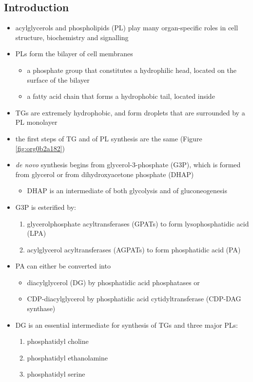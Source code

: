 \documentclass[12pt]{scrartcl}
\begin{document}
\subsection{Introduction}
\label{sec:org95c6505}
\begin{itemize}
\item acylglycerols and phospholipids (PL) play many organ-specific roles
in cell structure, biochemistry and signalling
\item PLs form the bilayer of cell membranes
\begin{itemize}
\item a phosphate group that constitutes a hydrophilic head, located on the surface of the bilayer
\item a fatty acid chain that forms a hydrophobic tail, located inside
\end{itemize}
\item TGs are extremely hydrophobic, and form droplets
that are surrounded by a PL monolayer
\item the first steps of TG and of PL synthesis are the same (Figure \ref{fig:org0b2a182})
\item \emph{de novo} synthesis begins from glycerol-3-phosphate (G3P), which is
formed from glycerol or from dihydroxyacetone phosphate (DHAP)
\begin{itemize}
\item DHAP is an intermediate of both glycolysis and of gluconeogenesis
\end{itemize}
\item G3P is esterified by:
\begin{enumerate}
\item glycerolphosphate acyltransferases (GPATs) to form lysophosphatidic acid (LPA)
\item acylglycerol acyltransferases (AGPATs) to form phosphatidic acid (PA)
\end{enumerate}
\item PA can either be converted into
\begin{itemize}
\item diacylglycerol (DG) by phosphatidic acid phosphatases or
\item CDP-diacylglycerol by phosphatidic acid cytidyltransferase (CDP-DAG synthase)
\end{itemize}
\item DG is an essential intermediate for synthesis of TGs and three major PLs:
\begin{enumerate}
\item phosphatidyl choline
\item phosphatidyl ethanolamine
\item phosphatidyl serine
\end{enumerate}
\end{itemize}
\end{document}
